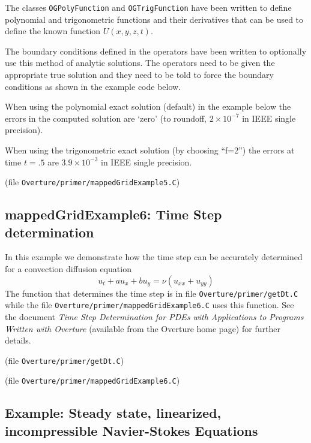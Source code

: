 \documentclass{article}
\begin{document}
The classes {\tt OGPolyFunction} and {\tt OGTrigFunction} have been written to define
polynomial and trigonometric functions and their derivatives that can be used to define
the known function $U(x,y,z,t)$.

The boundary conditions defined in the operators have been written to optionally use
this method of analytic solutions. The operators need to be given the appropriate
true solution and they need to be told to force the boundary conditions as shown
in the example code below.

When using the polynomial exact solution (default) in the example below
the errors in the computed solution are `zero' (to roundoff, $2\times 10^{-7}$ in IEEE single precision).

When using the trigonometric exact solution (by choosing ``f=2'') the errors at time $t=.5$
are  $3.9\times 10^{-3}$ in IEEE single precision.

(file {\tt Overture/primer/mappedGridExample5.C})
{\footnotesize
{}
}

\vfill\eject
\subsection{mappedGridExample6: Time Step determination}

In this example we demonstrate how the time step can be accurately determined
for a convection diffusion equation
\[
    u_t + a u_x + b u_y = \nu( u_{xx} + u_{yy} )
\]
The function that determines the time step is in 
file {\tt Overture/primer/getDt.C} while the file {\tt Overture/\-primer/\-mappedGridExample6.C}
uses this function. See the document {\it Time Step Determination for PDEs with Applications
to Programs Written with Overture} \cite{TIMESTEP} (available from the
Overture home page) for further details.

(file {\tt Overture/primer/getDt.C})
{\footnotesize
{}
}

(file {\tt Overture/primer/mappedGridExample6.C})
{\footnotesize
{}
}

\vfill\eject
\subsection{Example: Steady state, linearized, incompressible Navier-Stokes Equations}
\end{document}

